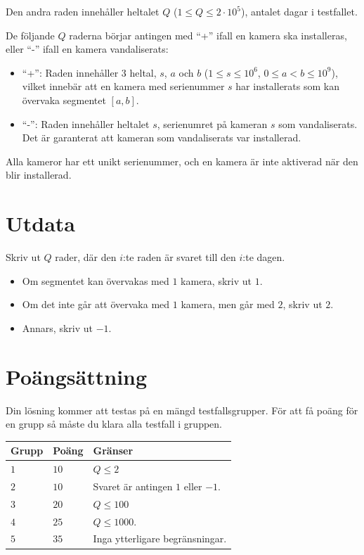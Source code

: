 Den andra raden innehåller heltalet $Q$ ($1 \le Q \le 2 \cdot 10^5$), antalet dagar i testfallet.

De följande $Q$ raderna börjar antingen med ``+'' ifall en kamera ska installeras, eller ``-'' ifall en kamera vandaliserats:
\begin{itemize}
  \item ``+'': Raden innehåller $3$ heltal, $s$, $a$ och $b$ ($1\le s \le 10^6$, $0\le a < b \le 10^9$), 
  vilket innebär att en kamera med serienummer $s$ har installerats som kan övervaka segmentet $[a,b]$.
  \item ``-'': Raden innehåller heltalet $s$, serienumret på kameran $s$ som vandaliserats.
  Det är garanterat att kameran som vandaliserats var installerad.
\end{itemize}

Alla kameror har ett unikt serienummer, och en kamera är inte aktiverad när den blir installerad.

\section*{Utdata}
Skriv ut $Q$ rader, där den $i$:te raden är svaret till den $i$:te dagen.
\begin{itemize}
  \item Om segmentet kan övervakas med $1$ kamera, skriv ut $1$.
  \item Om det inte går att övervaka med $1$ kamera, men går med $2$, skriv ut $2$.
  \item Annars, skriv ut $-1$.
\end{itemize}

\section*{Poängsättning}
Din lösning kommer att testas på en mängd testfallsgrupper.
För att få poäng för en grupp så måste du klara alla testfall i gruppen.

\noindent
\begin{tabular}{| l | l | p{12cm} |}
  \hline
  \textbf{Grupp} & \textbf{Poäng} & \textbf{Gränser} \\ \hline
  $1$    & $10$       & $Q \le 2$ \\ \hline
  $2$    & $10$       & Svaret är antingen $1$ eller $-1$. \\ \hline
  $3$    & $20$       & $Q \le 100$ \\ \hline
  $4$    & $25$       & $Q \le 1000$. \\ \hline
  $5$    & $35$       & Inga ytterligare begränsningar. \\ \hline
\end{tabular}

